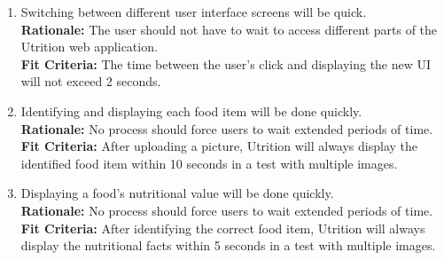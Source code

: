 \documentclass[12pt]{article}
\begin{document}
\begin{enumerate}[start=1,label={PR\arabic*.}]
	\item Switching between different user interface screens will be quick.\\
	\textbf{Rationale:} The user should not have to wait to access different parts of the Utrition web application.\\
	\textbf{Fit Criteria:} The time between the user’s click and displaying the new UI will not exceed 2 seconds.
	\item Identifying and displaying each food item will be done quickly.\\
	\textbf{Rationale:} No process should force users to wait extended periods of time.\\
	\textbf{Fit Criteria:} After uploading a picture, Utrition will always display the identified food item within 10 seconds in a test with multiple images.
	\item Displaying a food’s nutritional value will be done quickly. \\
	\textbf{Rationale:} No process should force users to wait extended periods of time. \\
	\textbf{Fit Criteria:} After identifying the correct food item, Utrition will always display the nutritional facts within 5 seconds in a test with multiple images.
\end{enumerate}
\end{document}
